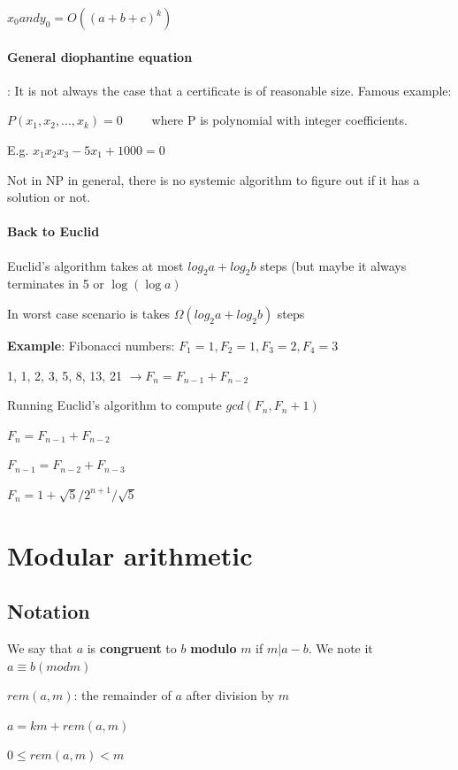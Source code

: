 \documentclass[9pt, letterpaper, oneside]{article}
\begin{document}
$x_0 and y_0 = O((a+b+c)^k)$

\paragraph{General diophantine equation}:
It is not always the case that a certificate is of reasonable size. Famous example:

$P(x_1, x_2, ..., x_k) = 0 \qquad$ where P is polynomial with integer coefficients.

E.g. $x_1x_2x_3 - 5x_1 + 1000 = 0$

Not in NP in general, there is no systemic algorithm to figure out if it has a solution or not.

\paragraph{Back to Euclid}

Euclid's algorithm takes at most $log_2{a} + log_2{b}$ steps (but maybe it always terminates in 5 or $\log(\log a)$

In worst case scenario is takes $\Omega(log_2{a} + log_2{b})$ steps

\textbf{Example}: Fibonacci numbers: $F_1 = 1, F_2 = 1, F_3 = 2, F_4 = 3$

1, 1, 2, 3, 5, 8, 13, 21 $ \to F_n = F_{n-1} + F_{n-2}$

Running Euclid's algorithm to compute $gcd(F_n, F_n+1)$

$F_n = F_{n-1}+ F_{n-2}$

$F_{n-1} = F_{n-2} + F_{n-3}$

$F_n = {{1 + \sqrt{5}}/2^{n+1}}/\sqrt{5}$


\section{Modular arithmetic}

\subsection{Notation}

We say that $a$ is \textbf{congruent} to $b$ \textbf{modulo} $m$ if $m | a - b$. We note it $a \equiv b (mod m)$

$rem(a, m)$: the remainder of $a$ after division by $m$

$a = km + rem(a, m)$

$0 \leq rem(a, m) < m$
\end{document}
